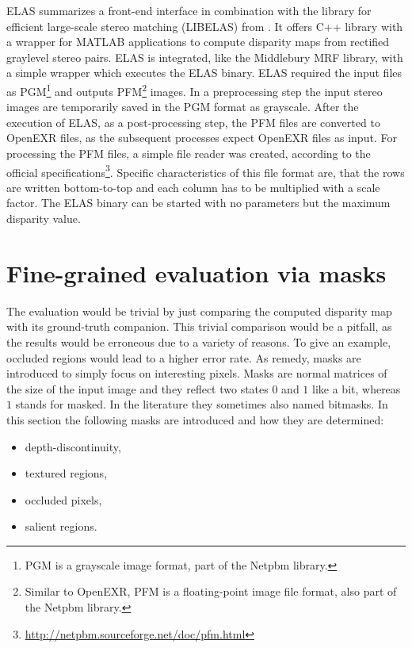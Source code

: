 ELAS summarizes a front-end interface in combination with the library for efficient large-scale stereo matching (LIBELAS) from \citeauthor{Geiger2010ACCV} \citep{Geiger2010ACCV, Geiger2011IV}.
It offers C++ library with a wrapper for MATLAB applications to compute disparity maps from rectified graylevel stereo pairs.
ELAS is integrated, like the Middlebury MRF library, with a simple wrapper which executes the ELAS binary.
ELAS required the input files as PGM\footnote{PGM is a grayscale image format, part of the Netpbm library.} and outputs PFM\footnote{Similar to OpenEXR, PFM is a floating-point image file format, also part of the Netpbm library.} images.
In a preprocessing step the input stereo images are temporarily saved in the PGM format as grayscale.
After the execution of ELAS, as a post-processing step, the PFM files are converted to OpenEXR files, as the subsequent processes expect OpenEXR files as input.
For processing the PFM files, a simple file reader was created, according to the official specifications\footnote{\url{http://netpbm.sourceforge.net/doc/pfm.html}}.
Specific characteristics of this file format are, that the rows are written bottom-to-top and each column has to be multiplied with a scale factor.
The ELAS binary can be started with no parameters but the maximum disparity value.

\newpage

\section{Fine-grained evaluation via masks}

The evaluation would be trivial by just comparing the computed disparity map with its ground-truth companion.
This trivial comparison would be a pitfall, as the results would be erroneous due to a variety of reasons.
To give an example, occluded regions would lead to a higher error rate.
As remedy, masks are introduced to simply focus on interesting pixels.
Masks are normal matrices of the size of the input image and they reflect two states $0$ and $1$ like a bit, whereas $1$ stands for masked.
In the literature they sometimes also named bitmasks.
In this section the following masks are introduced and how they are determined:

\begin{itemize}
  \item depth-discontinuity,
  \item textured regions,
  \item occluded pixels,
  \item salient regions.
\end{itemize}

